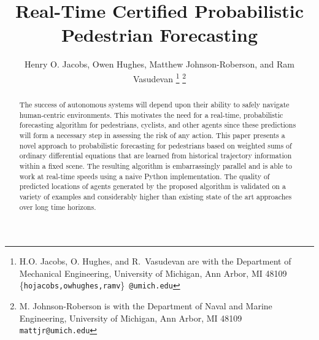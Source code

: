 \documentclass[letterpaper,10pt,conference]{ieeeconf}
\begin{document}
\title{Real-Time Certified Probabilistic Pedestrian Forecasting}

\author{Henry O. Jacobs, Owen Hughes, Matthew Johnson-Roberson, and Ram Vasudevan
 \thanks{ H.O. Jacobs, O. Hughes, and R.~Vasudevan are with the Department of Mechanical Engineering, University of Michigan, Ann Arbor, MI 48109
{\scriptsize \{\texttt{hojacobs,owhughes,ramv}\}~\texttt{@umich.edu}}}
\thanks{M. Johnson-Roberson is with the Department of Naval and Marine Engineering, University of Michigan, Ann Arbor, MI 48109\newline
{\scriptsize \texttt{mattjr@umich.edu}}}
}



\maketitle

\begin{abstract}
The success of autonomous systems will depend upon their ability to safely navigate human-centric environments.
This motivates the need for a real-time, probabilistic forecasting algorithm for pedestrians, cyclists, and other agents since these predictions will form a necessary step in assessing the risk of any action.
This paper presents a novel approach to probabilistic forecasting for pedestrians based on weighted sums of ordinary differential equations that are learned from historical trajectory information within a fixed scene.
The resulting algorithm is embarrassingly parallel and is able to work at real-time speeds using a naive Python implementation.
The quality of predicted locations of agents generated by the proposed algorithm is validated on a variety of examples and considerably higher than existing state of the art approaches over long time horizons.
\end{abstract}
\end{document}
